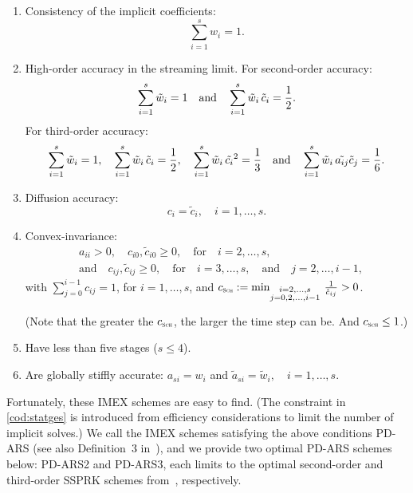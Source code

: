 \begin{enumerate}
    \item Consistency of the implicit coefficients:
    \begin{equation}
      \sum_{i=1}^{s}w_{i}=1.
    \end{equation}
    \item High-order accuracy in the streaming limit.
    For second-order accuracy:
    \begin{equation}
      \sum_{i=1}^{s}\tilde{w}_{i}=1
      \quad\text{and}\quad
      \sum_{i=1}^{s}\tilde{w}_{i}\,\tilde{c}_{i}=\frac{1}{2}.
      \label{eq:orderConditionsEx}
    \end{equation}
    For third-order accuracy: 
    \begin{equation}
    \sum_{i=1}^{s}\tilde{w}_{i}=1,
          \quad
          \sum_{i=1}^{s}\tilde{w}_{i}\,\tilde{c}_{i}=\frac{1}{2},
          \quad
          \sum_{i=1}^{s}\tilde{w}_{i}\,\tilde{c_{i}}^2 = \frac{1}{3}
          \quad\text{and}\quad
          \sum_{i=1}^{s}\tilde{w}_{i}\,\tilde{a_{ij}}\tilde{c}_{j}= \frac{1}{6}.
    \end{equation}
    \item Diffusion accuracy:
    \begin{equation}
      c_{i}=\tilde{c}_{i}, \quad i=1,\ldots,s.
      \label{eq:diffusionCondition}
    \end{equation}
    \item Convex-invariance:
    \begin{align}
      &a_{ii}>0, \quad c_{i0},\tilde{c}_{i0}\ge0, \quad \text{for} \quad i=2,\ldots,s, \nonumber \\
      &\text{and} \quad c_{ij},\tilde{c}_{ij}\ge0, \quad \text{for} \quad i=3,\ldots,s, \quad\text{and}\quad j=2,\ldots,i-1,
      \label{eq:convexInvariant}
    \end{align}
    with $\sum_{j=0}^{i-1}c_{ij}=1$, for $i=1,\ldots,s$, and $c_{\textnormal{\tiny\textsc{Sch}}}:=\min_{\substack{i = 2,\ldots,s \\ 
                  j = 0,2,\ldots,i-1}}\,\frac{1}{\hat{c}_{ij}}>0$.
                  
    (Note that the greater the $c_{\textnormal{\tiny\textsc{Sch}}}$, the larger the time step can be.
    And $c_{\textnormal{\tiny\textsc{Sch}}} \leq 1$.)
    \item Have less than five stages ($s\le4$)\label{cod:statges}.
    \item Are globally stiffly accurate: $a_{si}=w_{i}$ and $\tilde{a}_{si}=\tilde{w}_{i},\quad i=1,\ldots,s$. 
\end{enumerate}
Fortunately, these IMEX schemes are easy to find.  
(The constraint in \eqref{cod:statges} is introduced from efficiency considerations to limit the number of implicit solves.)
We call the IMEX schemes satisfying the above conditions {PD-ARS} (see also Definition~3 in~\cite{chu_etal_2018}), and we provide two optimal PD-ARS schemes below: PD-ARS2 and PD-ARS3, each limits to the optimal second-order and third-order SSPRK schemes from~\cite{shuOsher_1988}, respectively.
